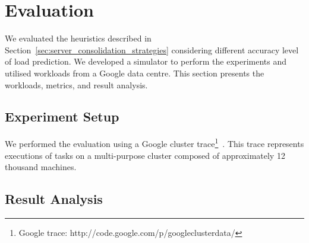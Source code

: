 \section{Evaluation}
\label{sec:evaluation}

We evaluated the heuristics described in Section~\ref{sec:server_consolidation_strategies} considering different accuracy level of load prediction. We developed a simulator to perform the experiments and utilised workloads from a Google data centre. This section presents the workloads, metrics, and result analysis.

\subsection{Experiment Setup}
We performed the evaluation using a Google cluster trace\footnote{Google trace: http://code.google.com/p/googleclusterdata/}~\cite{reiss2012heterogeneity}. This trace represents executions of tasks on a multi-purpose cluster composed of approximately 12 thousand machines.

\subsection{Result Analysis}
